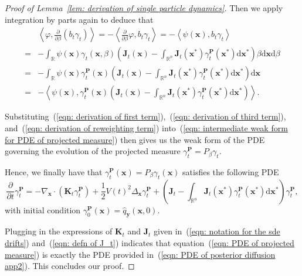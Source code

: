 \documentclass{article}
\numberwithin{equation}{section}
\def\eqref#1{(\ref{#1})}
\newcommand{\dif}{{\mathrm{d}}}
\def\vx{{\bm{x}}}
\def\vy{{\bm{y}}}
\def\mJ{{\bm{J}}}
\def\mK{{\bm{K}}}
\def\mP{{\bm{P}}}
\begin{document}
\begin{proof}[Proof of Lemma~\ref{lem: derivation of single particle dynamics}]
    Then we apply integration by parts again to deduce that
    \begin{equation}
    \label{eqn: derivation of reweighting term}
    \begin{aligned}
    &\left\langle \varphi, \frac{\partial}{\partial \beta}\left(b_t \gamma_t\right) \right\rangle = -\left\langle \frac{\partial}{\partial \beta}\varphi, b_t \gamma_t \right\rangle = -\left\langle \psi(\vx), b_t \gamma_t \right\rangle\\
    = &-\int_{\mathbb{R}}\psi(\vx)\gamma_t(\vx,\beta)\left(\mJ_t(\vx)-\int_{\mathbb{R}^n}\mJ_t(\vx^\ast)\gamma^{\mP}_t(\vx^\ast)\dif\vx^\ast\right)\beta\dif\vx\dif\beta\\
    = &-\int_{\mathbb{R}}\psi(\vx)\gamma^{\mP}_t(\vx)\left(\mJ_t(\vx)-\int_{\mathbb{R}^n}\mJ_t(\vx^\ast)\gamma^{\mP}_t(\vx^\ast)\dif\vx^\ast\right)\dif\vx\\
    = &-\left\langle\psi(\vx), \gamma^{\mP}_t(\vx)\left(\mJ_t(\vx)-\int_{\mathbb{R}^n}\mJ_t(\vx^\ast)\gamma^{\mP}_t(\vx^\ast)\dif\vx^\ast\right)\right\rangle.
    \end{aligned}    
    \end{equation}

    Substituting~\eqref{eqn: derivation of first term},~\eqref{eqn: derivation of third term}, and~\eqref{eqn: derivation of reweighting term} into~\eqref{eqn: intermediate weak form for PDE of projected measure} then gives us the weak form of the PDE governing the evolution of the projected measure $\gamma^{\mP}_t = P_{\beta}\gamma_t$. 
    
    Hence, we finally have that $\gamma^{\mP}_t(\vx) = P_{\beta}\gamma_t(\vx)$ satisfies the following PDE
    \begin{equation}
    \label{eqn: PDE of projected measure}
    \frac{\partial}{\partial t}\gamma^{\mP}_t = -\nabla_{\vx} \cdot \left(\mK_{t}\gamma^{\mP}_t\right) +\frac{1}{2}V(t)^2\Delta_{\vx}\gamma^{\mP}_t + \left(\mJ_t-\int_{\mathbb{R}^n}\mJ_t(\vx^\ast)\gamma^{\mP}_t(\vx^\ast)\dif\vx^\ast\right)\gamma^{\mP}_t,
    \end{equation}
    with initial condition $\gamma^{\mP}_0(\vx) =\widehat{q}_{\vy}(\vx,0)$. 
    
    Plugging in the expressions of $\mK_t$ and $\mJ_t$ given in~\eqref{eqn: notation for the sde drifts} and~\eqref{eqn: defn of J_t} indicates that equation~\eqref{eqn: PDE of projected measure} is exactly the PDE provided in~\eqref{eqn: PDE of posterior diffusion app2}. This concludes our proof.
\end{proof}
\end{document}
